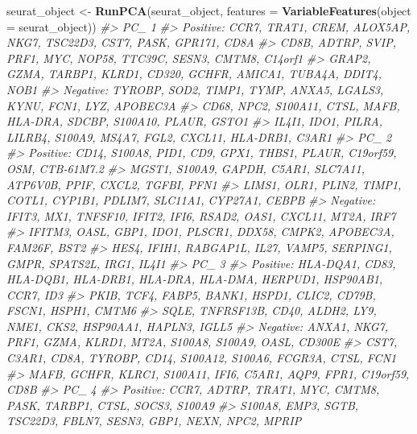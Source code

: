 \documentclass[
]{book}
\newenvironment{Shaded}{\begin{snugshade}}{\end{snugshade}}
\newcommand{\AttributeTok}[1]{\textcolor[rgb]{0.13,0.29,0.53}{#1}}
\newcommand{\CommentTok}[1]{\textcolor[rgb]{0.56,0.35,0.01}{\textit{#1}}}
\newcommand{\FunctionTok}[1]{\textcolor[rgb]{0.13,0.29,0.53}{\textbf{#1}}}
\newcommand{\NormalTok}[1]{#1}
\newcommand{\OtherTok}[1]{\textcolor[rgb]{0.56,0.35,0.01}{#1}}
\begin{document}
\begin{Shaded}
\begin{Highlighting}[]
\NormalTok{seurat\_object }\OtherTok{\textless{}{-}} \FunctionTok{RunPCA}\NormalTok{(seurat\_object, }\AttributeTok{features =} \FunctionTok{VariableFeatures}\NormalTok{(}\AttributeTok{object =}\NormalTok{ seurat\_object))}
\CommentTok{\#\textgreater{} PC\_ 1 }
\CommentTok{\#\textgreater{} Positive:  CCR7, TRAT1, CREM, ALOX5AP, NKG7, TSC22D3, CST7, PASK, GPR171, CD8A }
\CommentTok{\#\textgreater{}     CD8B, ADTRP, SVIP, PRF1, MYC, NOP58, TTC39C, SESN3, CMTM8, C14orf1 }
\CommentTok{\#\textgreater{}     GRAP2, GZMA, TARBP1, KLRD1, CD320, GCHFR, AMICA1, TUBA4A, DDIT4, NOB1 }
\CommentTok{\#\textgreater{} Negative:  TYROBP, SOD2, TIMP1, TYMP, ANXA5, LGALS3, KYNU, FCN1, LYZ, APOBEC3A }
\CommentTok{\#\textgreater{}     CD68, NPC2, S100A11, CTSL, MAFB, HLA{-}DRA, SDCBP, S100A10, PLAUR, GSTO1 }
\CommentTok{\#\textgreater{}     IL4I1, IDO1, PILRA, LILRB4, S100A9, MS4A7, FGL2, CXCL11, HLA{-}DRB1, C3AR1 }
\CommentTok{\#\textgreater{} PC\_ 2 }
\CommentTok{\#\textgreater{} Positive:  CD14, S100A8, PID1, CD9, GPX1, THBS1, PLAUR, C19orf59, OSM, CTB{-}61M7.2 }
\CommentTok{\#\textgreater{}     MGST1, S100A9, GAPDH, C5AR1, SLC7A11, ATP6V0B, PPIF, CXCL2, TGFBI, PFN1 }
\CommentTok{\#\textgreater{}     LIMS1, OLR1, PLIN2, TIMP1, COTL1, CYP1B1, PDLIM7, SLC11A1, CYP27A1, CEBPB }
\CommentTok{\#\textgreater{} Negative:  IFIT3, MX1, TNFSF10, IFIT2, IFI6, RSAD2, OAS1, CXCL11, MT2A, IRF7 }
\CommentTok{\#\textgreater{}     IFITM3, OASL, GBP1, IDO1, PLSCR1, DDX58, CMPK2, APOBEC3A, FAM26F, BST2 }
\CommentTok{\#\textgreater{}     HES4, IFIH1, RABGAP1L, IL27, VAMP5, SERPING1, GMPR, SPATS2L, IRG1, IL4I1 }
\CommentTok{\#\textgreater{} PC\_ 3 }
\CommentTok{\#\textgreater{} Positive:  HLA{-}DQA1, CD83, HLA{-}DQB1, HLA{-}DRB1, HLA{-}DRA, HLA{-}DMA, HERPUD1, HSP90AB1, CCR7, ID3 }
\CommentTok{\#\textgreater{}     PKIB, TCF4, FABP5, BANK1, HSPD1, CLIC2, CD79B, FSCN1, HSPH1, CMTM6 }
\CommentTok{\#\textgreater{}     SQLE, TNFRSF13B, CD40, ALDH2, LY9, NME1, CKS2, HSP90AA1, HAPLN3, IGLL5 }
\CommentTok{\#\textgreater{} Negative:  ANXA1, NKG7, PRF1, GZMA, KLRD1, MT2A, S100A8, S100A9, OASL, CD300E }
\CommentTok{\#\textgreater{}     CST7, C3AR1, CD8A, TYROBP, CD14, S100A12, S100A6, FCGR3A, CTSL, FCN1 }
\CommentTok{\#\textgreater{}     MAFB, GCHFR, KLRC1, S100A11, IFI6, C5AR1, AQP9, FPR1, C19orf59, CD8B }
\CommentTok{\#\textgreater{} PC\_ 4 }
\CommentTok{\#\textgreater{} Positive:  CCR7, ADTRP, TRAT1, MYC, CMTM8, PASK, TARBP1, CTSL, SOCS3, S100A9 }
\CommentTok{\#\textgreater{}     S100A8, EMP3, SGTB, TSC22D3, FBLN7, SESN3, GBP1, NEXN, NPC2, MPRIP }

\end{Highlighting}
\end{Shaded}
\end{document}
